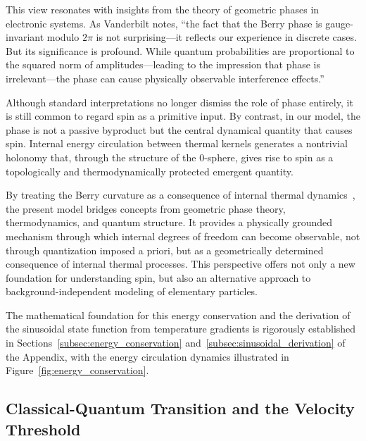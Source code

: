 \documentclass[%
 reprint,
 amsmath,amssymb,
 aps,
]{revtex4-1}
\numberwithin{equation}{section}%
\begin{document}
This view resonates with insights from the theory of geometric phases in electronic systems. As Vanderbilt notes, 
``the fact that the Berry phase is gauge-invariant modulo \(2\pi\) is not surprising—it reflects our experience in discrete cases. But its significance is profound. While quantum probabilities are proportional to the squared norm of amplitudes—leading to the impression that phase is irrelevant—the phase can cause physically observable interference effects.''~\cite{vanderbilt2018berry}

Although standard interpretations no longer dismiss the role of phase entirely, it is still common to regard spin as a primitive input. By contrast, in our model, the phase is not a passive byproduct but the central dynamical quantity that causes spin. Internal energy circulation between thermal kernels generates a nontrivial holonomy that, through the structure of the 0-sphere, gives rise to spin as a topologically and thermodynamically protected emergent quantity.


By treating the Berry curvature as a consequence of internal thermal dynamics~\cite{hanamura2507.0128}, the present model bridges concepts from geometric phase theory, thermodynamics, and quantum structure. It provides a physically grounded mechanism through which internal degrees of freedom can become observable, not through quantization imposed a priori, but as a geometrically determined consequence of internal thermal processes. This perspective offers not only a new foundation for understanding spin, but also an alternative approach to background-independent modeling of elementary particles.

The mathematical foundation for this energy conservation and the derivation of the sinusoidal state function from temperature gradients is rigorously established in Sections~\ref{subsec:energy_conservation} and~\ref{subsec:sinusoidal_derivation} of the Appendix, with the energy circulation dynamics illustrated in Figure~\ref{fig:energy_conservation}.


\subsection{Classical-Quantum Transition and the Velocity Threshold} \label{subsec:velocity_threshold}
\end{document}
